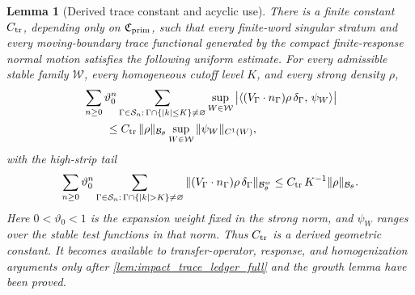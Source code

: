 \documentclass[12pt, letterpaper]{amsart}
\newcommand{\Bcal}{\mathcal{B}}
\providecommand{\Ssing}{\mathcal{S}}
\theoremstyle{plain}
\newtheorem{lemma}[theorem]{Lemma}
\theoremstyle{definition}
\theoremstyle{remark}
\begin{document}
\begin{lemma}[Derived trace constant and acyclic use]
\label{lem:derived_trace_constant_no_cycle}
There is a finite constant $C_{\rm tr}$, depending only on
$\mathfrak C_{\rm prim}$, such that every finite-word singular stratum and every
moving-boundary trace functional generated by the compact finite-response normal
motion satisfies the following uniform estimate.  For every admissible stable
family $\mathcal W$, every homogeneous cutoff level $K$, and every strong density
$\rho$,
\begin{equation}
\begin{split}
&\sum_{n\ge0}\vartheta_0^n
  \sum_{\Gamma\in\Ssing_n:\,\Gamma\cap\{|k|\le K\}\ne\varnothing}
  \sup_{W\in\mathcal W}
  \big|\langle (V_\Gamma\cdot n_\Gamma)\rho\,\delta_\Gamma,\,\psi_W\rangle\big|  \\
&\qquad\le C_{\rm tr}\,\|\rho\|_{\Bcal_\theta}
       \sup_{W\in\mathcal W}\|\psi_W\|_{C^1(W)},
\end{split}
\end{equation}
with the high-strip tail
\begin{equation}
 \sum_{n\ge0}\vartheta_0^n
  \sum_{\Gamma\in\Ssing_n:\,\Gamma\cap\{|k|>K\}\ne\varnothing}
  \|(V_\Gamma\cdot n_\Gamma)\rho\,\delta_\Gamma\|_{\Bcal^w_\theta}
  \le C_{\rm tr}\,K^{-1}\|\rho\|_{\Bcal_\theta} .
\end{equation}
Here $0<\vartheta_0<1$ is the expansion weight fixed in the strong norm, and
$\psi_W$ ranges over the stable test functions in that norm.  Thus
$C_{\rm tr}$ is a derived geometric constant.  It becomes available to
transfer-operator, response, and homogenization arguments only after
\cref{lem:impact_trace_ledger_full} and the growth lemma have been proved.
\end{lemma}
\end{document}
